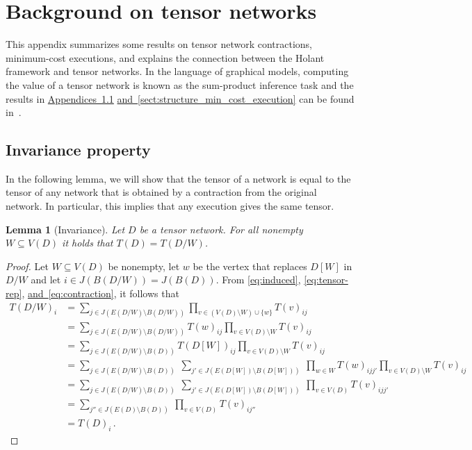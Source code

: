 \documentclass[11pt]{article}
\numberwithin{equation}{section}
\newtheorem{lemma}[theorem]{Lemma}
\theoremstyle{definition}
\theoremstyle{plain}
\newcommand{\expref}[2]{\hyperref[#2]{#1~\ref{#2}}}
\newcommand{\expeqref}[2]{\hyperref[#2]{#1~\eqref{#2}}}
\begin{document}
%

\appendix


\section{Background on tensor networks}

\label{sect:exec}

This appendix summarizes some results on tensor network contractions, minimum-cost executions, and explains the connection between the Holant framework and tensor networks.   In the language of graphical models, computing the value of a tensor network is known as the sum-product inference task and the results in \expref{Appendices}{sec:invariance_property} \expref{and}{sect:structure_min_cost_execution} can be found in~\cite[Part II]{KollerF2009}.

\subsection{Invariance property} \label{sec:invariance_property}

In the following lemma, we will show that the tensor of a network is equal to the tensor of any network that is obtained by a contraction from the original network. In particular, this implies that any execution gives the same tensor.

\begin{lemma}[Invariance]
\label{lem:invariance}
Let $D$ be a tensor network. For all nonempty $W\subseteq V(D)$ it holds that $T(D)=T(D/W)$.
\end{lemma}
\begin{proof}
Let $W\subseteq V(D)$ be nonempty, let $w$ be the vertex that replaces $D[W]$ in  $D/W$ and let $i\in J(B(D/W))=J(B(D))$.
From \eqref{eq:induced}, \eqref{eq:tensor-rep}, \expeqref{and}{eq:contraction},
it follows that
\[
\begin{split}
T(D/W)_i
&=
\sum_{j\in J(E(D/W)\setminus B(D/W))}
\prod_{v\in (V(D)\setminus W) \cup \{w\}}T(v)_{ij}\\
&=
\sum_{j\in J(E(D/W)\setminus B(D/W))}
T(w)_{ij}\prod_{v\in V(D)\setminus W}T(v)_{ij}\\
&=
\sum_{j\in J(E(D/W)\setminus B(D))}
T(D[W])_{ij}\prod_{v\in V(D)\setminus W}T(v)_{ij}\\
&=
\sum_{j\in J(E(D/W)\setminus B(D))}\
\sum_{j'\in J(E(D[W])\setminus B(D[W]))}\
\prod_{w\in W}T(w)_{ijj'}
\prod_{v\in V(D)\setminus W}T(v)_{ij}\\
&=
\sum_{j\in J(E(D/W)\setminus B(D))}\
\sum_{j'\in J(E(D[W])\setminus B(D[W]))}\
\prod_{v\in V(D)}T(v)_{ijj'}\\
&=
\sum_{j''\in J(E(D)\setminus B(D))}\
\prod_{v\in V(D)}T(v)_{ij''}\\
&=T(D)_i\,.
\end{split}
\]
\end{proof}
\end{document}
